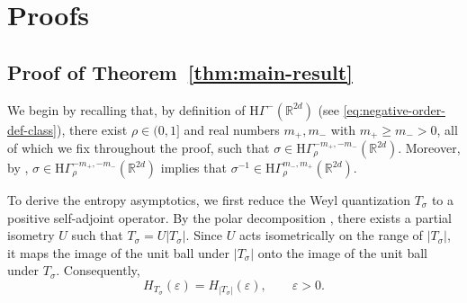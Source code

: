 \documentclass[a4paper,12pt]{article}
\newcommand{\R}{\mathbb{R}}
\newcommand{\hyposymbclass}{\text{H}\Gamma^{m_-,m_+}_\rho}
\newcommand{\hyposymbclassinv}{\mathrm{H}\Gamma^{-m_+,-m_-}_\rho}
\newcommand{\hyponegclass}{\mathrm{H}\Gamma^-}
\newcommand{\symbolnot}{\sigma}
\begin{document}
\color{black}


\section{Proofs}

\subsection{Proof of Theorem~\ref{thm:main-result}}\label{sec:proof-main-result}

We begin by recalling that, by definition of $\hyponegclass(\R^{2d})$
(see \eqref{eq:negative-order-def-class}), there exist $\rho\in(0,1]$ and real numbers $m_+,m_-$ with $m_+\ge m_->0$, all of which we fix throughout the proof,
such that $\symbolnot \in \hyposymbclassinv(\R^{2d})$.
Moreover, by \cite[Lemma~25.1,~1)a)]{shubin_pseudodifferential_2001},
$\symbolnot \in \hyposymbclassinv(\R^{2d})$ implies that
$\symbolnot^{-1}\in \hyposymbclass(\R^{2d})$.



To derive the entropy asymptotics, we first reduce the Weyl quantization
$T_\sigma$ to a positive self-adjoint operator.
By the polar decomposition \cite[VIII.3.11]{conway},
there exists a partial isometry $U$ such that
$T_\sigma = U |T_\sigma|$.
Since $U$ acts isometrically on the range of $|T_\sigma|$,
it maps the image of the unit ball under $|T_\sigma|$
onto the image of the unit ball under $T_\sigma$.
Consequently,
\begin{equation}\label{eq:equality-entropies-absolute-value}
    H_{T_\sigma}(\varepsilon)
    =
    H_{|T_\sigma|}(\varepsilon),
    \qquad \varepsilon>0.
\end{equation}
\end{document}
